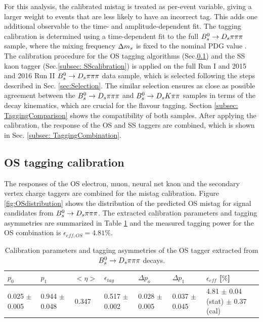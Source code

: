 For this analysis, the calibrated mistag is treated as per-event variable, giving a larger weight to events that are less likely to have an incorrect tag. 
This adds one additional observable to the time- and amplitude-dependent fit. \newline
The tagging calibration is determined using a time-dependent fit to the full ${{B}^0_{s}}\rightarrow{\ensuremath{{D}_{s}}}{\ensuremath{\pi}}{\ensuremath{\pi}}{\ensuremath{\pi}}$ sample, where the mixing frequency ${\Delta m_{{s}}}$ is fixed to the nominal PDG value \cite{PDG2014}.
The calibration procedure for the OS tagging algorithms (Sec.\ref{subsec: OScalibration}) and 
the SS kaon tagger (Sec.\ref{subsec: SScalibration}) is applied on the full Run I and 2015 and 2016 Run II ${{B}^0_{s}}\rightarrow{\ensuremath{{D}_{s}}}{\ensuremath{\pi}}{\ensuremath{\pi}}{\ensuremath{\pi}}$ data sample, which is selected following the steps described in Sec. \ref{sec:Selection}.
The similar selection ensures as close as possible agreement between the ${{B}^0_{s}}\rightarrow{\ensuremath{{D}_{s}}}{\ensuremath{\pi}}{\ensuremath{\pi}}{\ensuremath{\pi}}$ and ${{B}^0_{s}}\rightarrow{\ensuremath{{D}_{s}}}{\ensuremath{K}}{\ensuremath{\pi}}{\ensuremath{\pi}}$ samples in terms of the decay kinematics, which are crucial for the flavour tagging.
Section \ref{subsec: TaggingComparison} shows the compatibility of both samples. After applying the calibration, the response of the OS and SS taggers are combined, which is shown in Sec. \ref{subsec: TaggingCombination}.  



\subsection{OS tagging calibration}
\label{subsec: OScalibration}
The responses of the OS electron, muon, neural net kaon and the secondary vertex charge taggers are combined for the mistag calibration. 
Figure \ref{fig:OSdistribution} shows the distribution of the predicted OS mistag for signal candidates from ${{B}^0_{s}}\rightarrow{\ensuremath{{D}_{s}}}{\ensuremath{\pi}}{\ensuremath{\pi}}{\ensuremath{\pi}}$. 
The extracted calibration parameters and tagging asymmetries are summarized in Table \ref{table: OScalibration} and the measured tagging power for the OS combination is $\epsilon_{eff,OS} = 4.81 \%$.


\begin{table}[h]
\centering
\scriptsize
 \begin{tabular}{l l l l | l l | l}
\hline
$p_{0}$ & $p_{1}$ & $<\eta>$ & $\epsilon_{tag}$ & $\Delta p_{o}$ & $\Delta p_{1}$ & $\epsilon_{eff}$ [$\%$] \\
\hline
0.025 $\pm$0.005  & 0.944 $\pm$ 0.048 & 0.347 & 0.517 $\pm$ 0.002 & 0.028 $\pm$ 0.005 & 0.037 $\pm$ 0.045 & 4.81 $\pm$ 0.04 (stat) $\pm$ 0.37 (cal) \\
\hline
\end{tabular}
\caption{Calibration parameters and tagging asymmetries of the OS tagger extracted from ${{B}^0_{s}}\rightarrow{\ensuremath{{D}_{s}}}{\ensuremath{\pi}}{\ensuremath{\pi}}{\ensuremath{\pi}}$ decays.}
\label{table: OScalibration}
\normalsize
\end{table}


